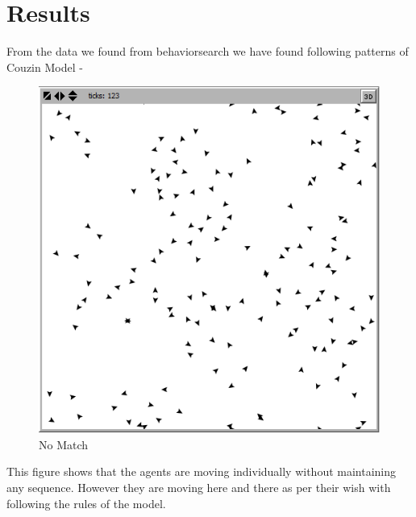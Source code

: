 \documentclass{article}
\begin{document}
\section{Results}
From the data we found from behaviorsearch we have found following patterns of Couzin Model - 





\begin{figure}[H]
  \includegraphics[width=\linewidth]{nomatch.png}
  \caption{No Match}
  
  
 
\end{figure}

This figure shows that the agents are moving individually without maintaining any sequence. However they are moving here and there as per their wish with following the rules of the model.
\end{document}

